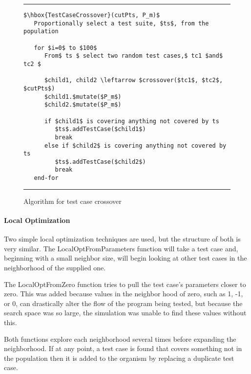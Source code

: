 \documentclass[runningheads]{llncs}
\begin{document}

\begin{figure}[h!]
\begin{center}
\hrule
\medskip
\begin{Verbatim}[fontfamily=tt, xleftmargin=10pt, commandchars=\\\{\},
		codes={\catcode`$=3\catcode`^=7\catcode`_=8}]
$\hbox{TestCaseCrossover}(cutPts, P_m)$  
   Proportionally select a test suite, $ts$, from the population

   for $i=0$ to $100$
      From$ ts $ select two random test cases,$ tc1 $and$ tc2 $

      $child1, child2 \leftarrow $crossover($tc1$, $tc2$, $cutPts$)
      $child1.$mutate($P_m$)
      $child2.$mutate($P_m$)

      if $child1$ is covering anything not covered by ts
         $ts$.addTestCase($child1$)
         break
      else if $child2$ is covering anything not covered by ts
         $ts$.addTestCase($child2$)
         break
   end-for
\end{Verbatim}
\hrule
\end{center}
\caption{Algorithm for test case crossover \label{fig:tcCross}}
\end{figure}


\FloatBarrier
\paragraph{Local Optimization}
Two simple local optimization techniques are used, but the structure of both is very similar. The LocalOptFromParameters function will take a test case and, beginning with a small neighbor size, will begin looking at other test cases in the neighborhood of the supplied one. 

The LocalOptFromZero function tries to pull the test case's parameters closer to zero. This was added because values in the neighbor hood of zero, such as 1, -1, or 0, can drastically alter the flow of the program being tested, but because the search space was so large, the simulation was unable to find these values without this.

Both functions explore each neighborhood several times before expanding the neighborhood. If at any point, a test case is found that covers something not in the population then it is added to the organism by replacing a duplicate test case.
\end{document}
